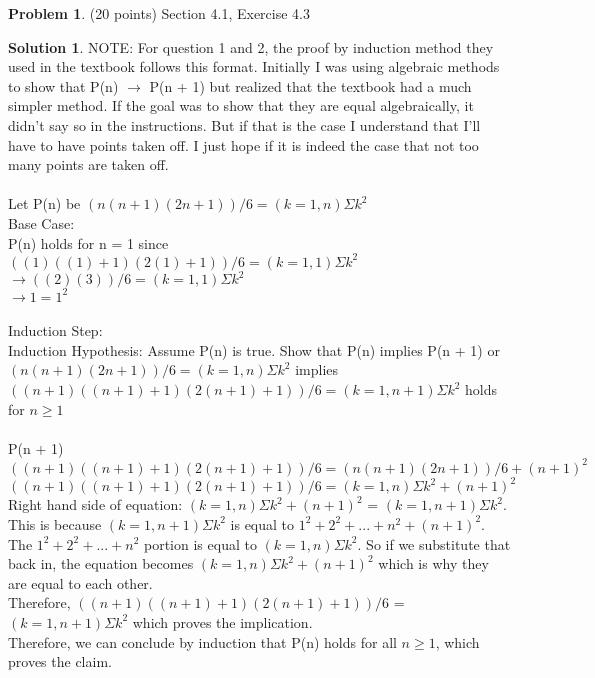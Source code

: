 \documentclass{article}
\theoremstyle{definition}
\newtheorem{problem}{Problem}
\newtheorem*{solution}{Solution}
\begin{document}
\begin{problem} (20 points) Section 4.1, Exercise 4.3
\end{problem}
\begin{solution} 
NOTE: For question 1 and 2, the proof by induction method they used in the textbook follows this format. Initially I was using algebraic methods to show that P(n) $\to$ P(n + 1) but realized that the textbook had a much simpler method. If the goal was to show that they are equal algebraically, it didn't say so in the instructions. But if that is the case I understand that I'll have to have points taken off. I just hope if it is indeed the case that not too many points are taken off. \\
\\
Let P(n) be $(n(n + 1)(2n + 1)) / 6 = (k = 1, n)\Sigma k^2$ \\
Base Case: \\
P(n) holds for n = 1 since \\
$((1)((1) + 1)(2(1) + 1)) / 6 = (k = 1, 1)\Sigma k^2$ \\
$\to ((2)(3)) / 6 = (k = 1, 1)\Sigma k^2$ \\
$\to 1 = 1^2$ \\
\\
Induction Step: \\
Induction Hypothesis: Assume P(n) is true. Show that P(n) implies P(n + 1) or $(n(n + 1)(2n + 1)) / 6 = (k = 1, n)\Sigma k^2$ implies \\
$((n + 1)((n + 1) + 1)(2(n + 1) + 1)) / 6 = (k = 1, n + 1)\Sigma k^2$ holds for $n \geqslant 1$ \\
\\
P(n + 1) \\
$((n + 1)((n + 1) + 1)(2(n + 1) + 1)) / 6 = (n(n + 1)(2n + 1)) / 6 + (n + 1)^2$\\
$((n + 1)((n + 1) + 1)(2(n + 1) + 1)) / 6 = (k = 1, n)\Sigma k^2 + (n + 1)^2$\\
Right hand side of equation: $(k = 1, n)\Sigma k^2 + (n + 1)^2$ = $(k = 1, n + 1)\Sigma k^2$. This is because $(k = 1, n + 1)\Sigma k^2$ is equal to $1^2 + 2^2 + ... + n^2 + (n+1)^2$. The $1^2 + 2^2 + ... + n^2$ portion is equal to $(k = 1, n)\Sigma k^2$. So if we substitute that back in, the equation becomes $(k = 1, n)\Sigma k^2 + (n + 1)^2$ which is why they are equal to each other.\\
Therefore, $((n + 1)((n + 1) + 1)(2(n + 1) + 1)) / 6$ = $(k = 1, n + 1)\Sigma k^2$ which proves the implication. \\
Therefore, we can conclude by induction that P(n) holds for all $n \geqslant 1$, which proves the claim.
\end{solution}
\end{document}

